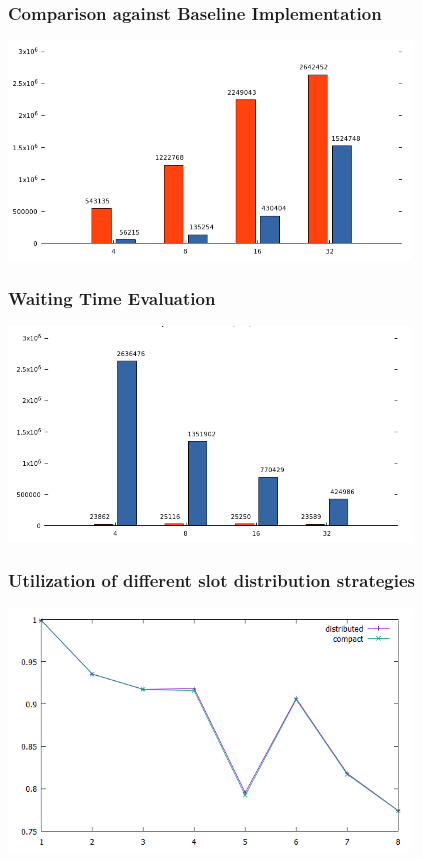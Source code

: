 \documentclass{beamer}
\begin{document}
\begin{frame}
	\frametitle{Comparison against Baseline Implementation}
	\begin{center}
		\includegraphics[width=0.8\textwidth]{img/pool_baseline.png}
	\end{center}
	
\end{frame}

\begin{frame}
	\frametitle{Waiting Time Evaluation}
	\begin{center}
		\includegraphics[width=0.8\textwidth]{img/pool_avg.png}
	\end{center}

\end{frame}

\begin{frame}
	\frametitle{Utilization of different slot distribution strategies}
	\begin{center}
		\includegraphics[width=0.8\textwidth]{img/slot_distr.png}
	\end{center}

\end{frame}
\end{document}
